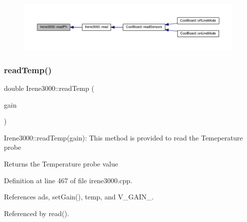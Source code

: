 \begin{figure}[H]
\begin{center}
\leavevmode
\includegraphics[width=350pt]{classIrene3000_abf3db725fabb0634ec889b32068a5eec_icgraph}
\end{center}
\end{figure}
\mbox{\label{classIrene3000_a94ad40f281d83ad1be20bf1edd6fe802}} 
\subsubsection{\texorpdfstring{read\+Temp()}{readTemp()}}
{\footnotesize\ttfamily double Irene3000\+::read\+Temp (\begin{DoxyParamCaption}\item[{ads\+Gain\+\_\+t}]{gain }\end{DoxyParamCaption})}

Irene3000\+::read\+Temp(gain)\+: This method is provided to read the Temeperature probe

\begin{DoxyReturn}{Returns}
the Temperature probe value 
\end{DoxyReturn}


Definition at line 467 of file irene3000.\+cpp.



References ads, set\+Gain(), temp, and V\+\_\+\+G\+A\+I\+N\+\_.



Referenced by read().


